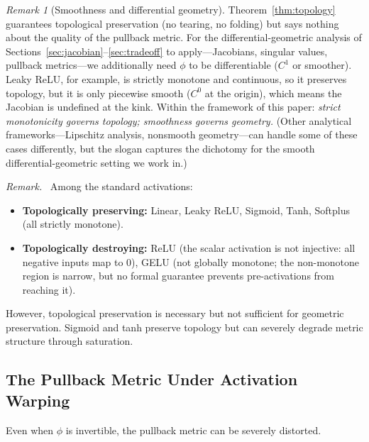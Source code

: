 \documentclass[11pt,a4paper]{article}
\theoremstyle{remark}
\newtheorem{remark}{Remark}
\newenvironment{keyresult}{\par\medskip\noindent\textit{Remark.}\ }{\par\medskip}
\begin{document}
\begin{remark}[Smoothness and differential geometry]
\label{rem:smoothness}
Theorem~\ref{thm:topology} guarantees topological preservation (no tearing, no folding) but says nothing about the quality of the pullback metric.
For the differential-geometric analysis of Sections~\ref{sec:jacobian}--\ref{sec:tradeoff} to apply---Jacobians, singular values, pullback metrics---we additionally need $\phi$ to be differentiable ($C^1$ or smoother).
Leaky ReLU, for example, is strictly monotone and continuous, so it preserves topology, but it is only piecewise smooth ($C^0$ at the origin), which means the Jacobian is undefined at the kink.
Within the framework of this paper: \emph{strict monotonicity governs topology; smoothness governs geometry.}
(Other analytical frameworks---Lipschitz analysis, nonsmooth geometry---can handle some of these cases differently, but the slogan captures the dichotomy for the smooth differential-geometric setting we work in.)
\end{remark}

\begin{keyresult}
Among the standard activations:
\begin{itemize}
  \item \textbf{Topologically preserving:} Linear, Leaky ReLU, Sigmoid, Tanh, Softplus (all strictly monotone).
  \item \textbf{Topologically destroying:} ReLU (the scalar activation is not injective: all negative inputs map to 0), GELU (not globally monotone; the non-monotone region is narrow, but no formal guarantee prevents pre-activations from reaching it).
\end{itemize}
However, topological preservation is necessary but not sufficient for geometric preservation.  Sigmoid and tanh preserve topology but can severely degrade metric structure through saturation.
\end{keyresult}

\subsection{The Pullback Metric Under Activation Warping}

Even when $\phi$ is invertible, the pullback metric can be severely distorted.
\end{document}
